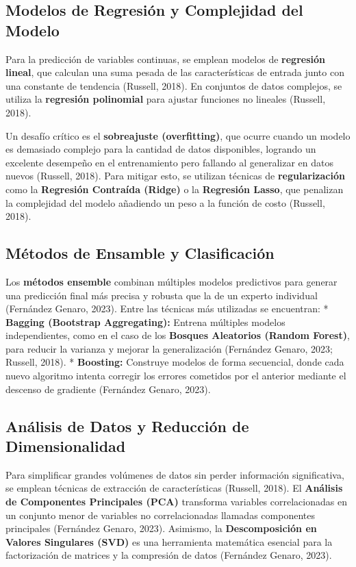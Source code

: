 \documentclass[
  spanish,
  12pt,
]{report}
\begin{document}
\subsection{Modelos de Regresión y Complejidad del
Modelo}\label{modelos-de-regresiuxf3n-y-complejidad-del-modelo}

Para la predicción de variables continuas, se emplean modelos de
\textbf{regresión lineal}, que calculan una suma pesada de las
características de entrada junto con una constante de tendencia
(Russell, 2018). En conjuntos de datos complejos, se utiliza la
\textbf{regresión polinomial} para ajustar funciones no lineales
(Russell, 2018).

Un desafío crítico es el \textbf{sobreajuste (overfitting)}, que ocurre
cuando un modelo es demasiado complejo para la cantidad de datos
disponibles, logrando un excelente desempeño en el entrenamiento pero
fallando al generalizar en datos nuevos (Russell, 2018). Para mitigar
esto, se utilizan técnicas de \textbf{regularización} como la
\textbf{Regresión Contraída (Ridge)} o la \textbf{Regresión Lasso}, que
penalizan la complejidad del modelo añadiendo un peso a la función de
costo (Russell, 2018).

\subsection{Métodos de Ensamble y
Clasificación}\label{muxe9todos-de-ensamble-y-clasificaciuxf3n}

Los \textbf{métodos ensemble} combinan múltiples modelos predictivos
para generar una predicción final más precisa y robusta que la de un
experto individual (Fernández Genaro, 2023). Entre las técnicas más
utilizadas se encuentran: * \textbf{Bagging (Bootstrap Aggregating):}
Entrena múltiples modelos independientes, como en el caso de los
\textbf{Bosques Aleatorios (Random Forest)}, para reducir la varianza y
mejorar la generalización (Fernández Genaro, 2023; Russell, 2018). *
\textbf{Boosting:} Construye modelos de forma secuencial, donde cada
nuevo algoritmo intenta corregir los errores cometidos por el anterior
mediante el descenso de gradiente (Fernández Genaro, 2023).

\subsection{Análisis de Datos y Reducción de
Dimensionalidad}\label{anuxe1lisis-de-datos-y-reducciuxf3n-de-dimensionalidad}

Para simplificar grandes volúmenes de datos sin perder información
significativa, se emplean técnicas de extracción de características
(Russell, 2018). El \textbf{Análisis de Componentes Principales (PCA)}
transforma variables correlacionadas en un conjunto menor de variables
no correlacionadas llamadas componentes principales (Fernández Genaro,
2023). Asimismo, la \textbf{Descomposición en Valores Singulares (SVD)}
es una herramienta matemática esencial para la factorización de matrices
y la compresión de datos (Fernández Genaro, 2023).
\end{document}
